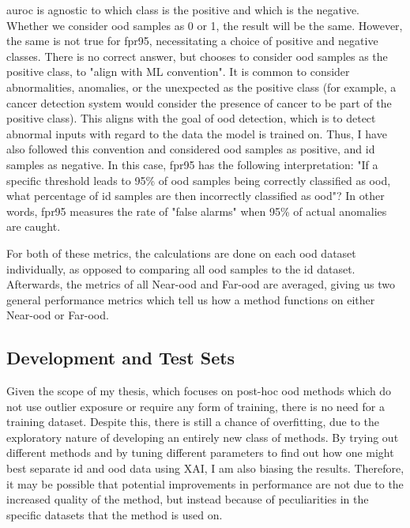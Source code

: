 \documentclass[UKenglish]{uiomasterthesis} %
\theoremstyle{definition}
\begin{document}
\ac{auroc} is agnostic to which class is the positive and which is the negative. Whether we consider \ac{ood} samples as 0 or 1, the result will be the same. However, the same is not true for \ac{fpr95}, necessitating a choice of positive and negative classes. There is no correct answer, but \cite{openood} chooses to consider \ac{ood} samples as the positive class, to "align with ML convention". It is common to consider abnormalities, anomalies, or the unexpected as the positive class (for example, a cancer detection system would consider the presence of cancer to be part of the positive class). This aligns with the goal of \ac{ood} detection, which is to detect abnormal inputs with regard to the data the model is trained on. Thus, I have also followed this convention and considered \ac{ood} samples as positive, and \ac{id} samples as negative. In this case, \ac{fpr95} has the following interpretation: "If a specific threshold leads to 95\% of \ac{ood} samples being correctly classified as \ac{ood}, what percentage of \ac{id} samples are then incorrectly classified as \ac{ood}"? In other words, \ac{fpr95} measures the rate of "false alarms" when 95\% of actual anomalies are caught.

For both of these metrics, the calculations are done on each \ac{ood} dataset individually, as opposed to comparing all \ac{ood} samples to the \ac{id} dataset. Afterwards, the metrics of all Near-\ac{ood} and Far-\ac{ood} are averaged, giving us two general performance metrics which tell us how a method functions on either Near-\ac{ood} or Far-\ac{ood}.

\subsection{Development and Test Sets}

Given the scope of my thesis, which focuses on post-hoc \ac{ood} methods which do not use outlier exposure or require any form of training, there is no need for a training dataset. Despite this, there is still a chance of overfitting, due to the exploratory nature of developing an entirely new class of methods. By trying out different methods and by tuning different parameters to find out how one might best separate \ac{id} and \ac{ood} data using XAI, I am also biasing the results. Therefore, it may be possible that potential improvements in performance are not due to the increased quality of the method, but instead because of peculiarities in the specific datasets that the method is used on.
\end{document}
